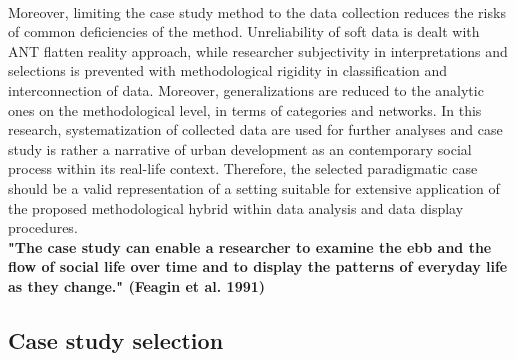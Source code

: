 \documentclass[11pt]{report}
\begin{document}
\\
Moreover, limiting the case study method to the data collection reduces the risks of common deficiencies of the method. Unreliability of soft data is dealt with ANT flatten reality approach, while researcher subjectivity in interpretations and selections is prevented with methodological rigidity in classification and interconnection of data. Moreover, generalizations are reduced to the analytic ones on the methodological level, in terms of categories and networks. In this research, systematization of collected data are used for further analyses and case study is rather a narrative of urban development as an contemporary social process within its real-life context. Therefore, the selected paradigmatic case should be a valid representation of a setting suitable for extensive application of the proposed methodological hybrid within data analysis and data display procedures.
\\
\textbf{"The case study can enable a researcher to examine the ebb and the flow of social life over time and to display the patterns of everyday life as they change." (Feagin et al. 1991)}

\subsection{Case study selection}
\end{document}
